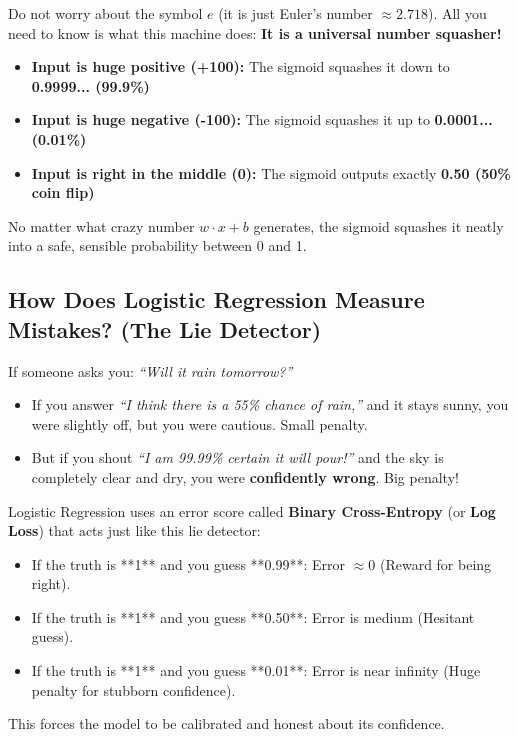 \documentclass[11pt,journal,onecolumn]{IEEEtran}
\begin{document}
Do not worry about the symbol $e$ (it is just Euler's number $\approx 2.718$). All you need to know is what this machine does: \textbf{It is a universal number squasher!}

\begin{itemize}
    \item \textbf{Input is huge positive (+100):} The sigmoid squashes it down to \textbf{0.9999... (99.9\%)}
    \item \textbf{Input is huge negative (-100):} The sigmoid squashes it up to \textbf{0.0001... (0.01\%)}
    \item \textbf{Input is right in the middle (0):} The sigmoid outputs exactly \textbf{0.50 (50\% coin flip)}
\end{itemize}

No matter what crazy number $w \cdot x + b$ generates, the sigmoid squashes it neatly into a safe, sensible probability between 0 and 1.

\subsection{How Does Logistic Regression Measure Mistakes? (The Lie Detector)}
If someone asks you: \textit{``Will it rain tomorrow?''}
\begin{itemize}
    \item If you answer \textit{``I think there is a 55\% chance of rain,''} and it stays sunny, you were slightly off, but you were cautious. Small penalty.
    \item But if you shout \textit{``I am 99.99\% certain it will pour!''} and the sky is completely clear and dry, you were \textbf{confidently wrong}. Big penalty!
\end{itemize}

Logistic Regression uses an error score called \textbf{Binary Cross-Entropy} (or \textbf{Log Loss}) that acts just like this lie detector:
\begin{itemize}
    \item If the truth is **1** and you guess **0.99**: Error $\approx 0$ (Reward for being right).
    \item If the truth is **1** and you guess **0.50**: Error is medium (Hesitant guess).
    \item If the truth is **1** and you guess **0.01**: Error is near infinity (Huge penalty for stubborn confidence).
\end{itemize}

This forces the model to be calibrated and honest about its confidence.
\end{document}

